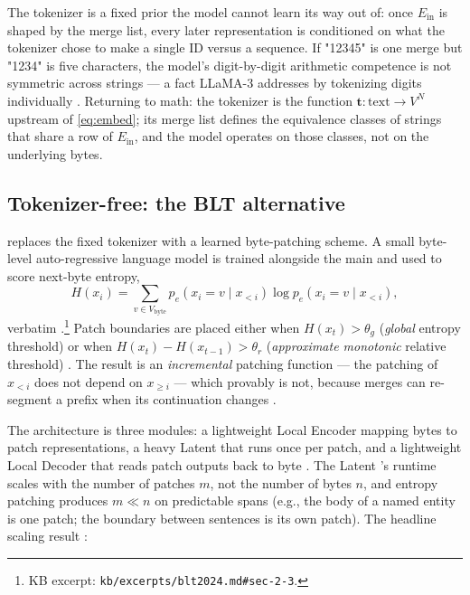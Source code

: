 \begin{analogy}
The tokenizer is a fixed prior the model cannot learn its way out of:
once $E_{\text{in}}$ is shaped by the merge list, every later
representation is conditioned on what the tokenizer chose to make a
single ID versus a sequence. If "12345" is one  merge but "1234" is
five characters, the model's digit-by-digit arithmetic competence is
not symmetric across strings — a fact LLaMA-3 addresses by tokenizing
digits individually \citep[\S 3.1]{meta-llama3}. Returning to math:
the tokenizer is the function $\mathbf{t}: \text{text} \to V^N$
upstream of \cref{eq:embed}; its merge list defines the equivalence
classes of strings that share a row of $E_{\text{in}}$, and the model
operates on those classes, not on the underlying bytes.
\end{analogy}

\subsection{Tokenizer-free: the BLT alternative}
\label{sec:tok-blt}

\citet{blt2024} replaces the fixed tokenizer with a learned
byte-patching scheme. A small byte-level auto-regressive language
model is trained alongside the main  and used to score next-byte
entropy,
\begin{equation}
H(x_i) = \sum_{v \in V_{\text{byte}}} p_e(x_i = v \mid x_{<i}) \log p_e(x_i = v \mid x_{<i}),
\label{eq:blt-entropy}
\end{equation}
verbatim \citep[Eq.~1]{blt2024}.\footnote{KB excerpt:
\nolinkurl{kb/excerpts/blt2024.md#sec-2-3}.} Patch boundaries are placed
either when $H(x_t) > \theta_g$ (\emph{global} entropy threshold) or
when $H(x_t) - H(x_{t-1}) > \theta_r$ (\emph{approximate monotonic}
relative threshold) \citep[\S 2.3]{blt2024}. The result is an
\emph{incremental} patching function — the patching of $x_{<i}$ does
not depend on $x_{\geq i}$ — which  provably is not, because 
merges can re-segment a prefix when its continuation changes
\citep[\S 2.4]{blt2024}.

The architecture is three modules: a lightweight Local Encoder mapping
bytes to patch representations, a heavy Latent  that runs
once per patch, and a lightweight Local Decoder that reads patch
outputs back to byte  \citep[\S 3]{blt2024}. The Latent
's runtime scales with the number of patches $m$, not the
number of bytes $n$, and entropy patching produces $m \ll n$ on
predictable spans (e.g., the body of a named entity is one patch; the
boundary between sentences is its own patch). The headline scaling
result \citep[\S 1, Fig.~1]{blt2024}:

